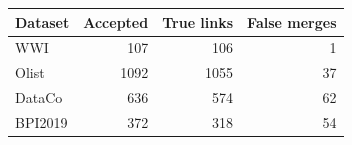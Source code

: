 \begin{tabular}{lrrr}
\toprule
Dataset & Accepted & True links & False merges \\
\midrule
WWI & 107 & 106 & 1 \\
Olist & 1092 & 1055 & 37 \\
DataCo & 636 & 574 & 62 \\
BPI2019 & 372 & 318 & 54 \\
\bottomrule
\end{tabular}

